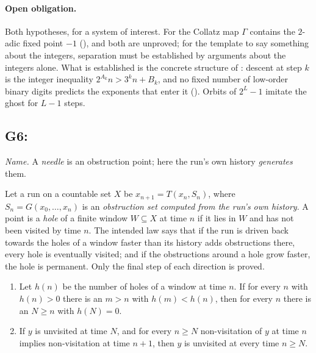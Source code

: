 \paragraph{Open obligation.} Both hypotheses, for a system of interest. For the Collatz map
$\Gamma$ contains the $2$-adic fixed point $-1$ (), and both are unproved;
for the template to say something about the integers, separation must be established by arguments
about the integers alone. What is established is the concrete structure of :
descent at step $k$ is the integer inequality $2^{A_k} n > 3^k n + B_k$, and no fixed number of
low-order binary digits predicts the exponents that enter it (). Orbits of
$2^L - 1$ imitate the ghost for $L - 1$ steps.

\subsection{G6: \lawGSix}\label{sec:G6}

\emph{Name.} A \emph{needle} is an obstruction point; here the run's own history
\emph{generates} them.

Let a run on a countable set $X$ be $x_{n+1} = T(x_n, S_n)$, where $S_n = G(x_0, \ldots, x_n)$ is an
\emph{obstruction set computed from the run's own history}. A point is a \emph{hole} of a finite
window $W \subseteq X$ at time $n$ if it lies in $W$ and has not been visited by time $n$. The
intended law says that if the run is driven back towards the holes of a window faster than its
history adds obstructions there, every hole is eventually visited; and if the obstructions around a
hole grow faster, the hole is permanent. Only the final step of each direction is proved.

\begin{proposition}\label{thm:G6}
\begin{enumerate}
  \item Let $h(n)$ be the number of holes of a window at time $n$.
    If for every $n$ with $h(n) > 0$ there is an $m > n$ with $h(m) < h(n)$, then for every $n$
    there is an $N \ge n$ with $h(N) = 0$.
  \item If $y$ is unvisited at time $N$, and for every
    $n \ge N$ non-visitation of $y$ at time $n$ implies non-visitation at time $n+1$, then $y$ is
    unvisited at every time $n \ge N$.
\end{enumerate}
\end{proposition}

